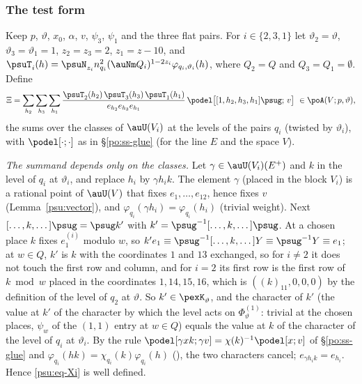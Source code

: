 \documentclass[10pt]{amsart}
\theoremstyle{definition}
\theoremstyle{remark}
\begin{document}
\subsubsection{The test form}\label{psu:ss-test}

Keep $p$, $\vartheta$, $x_0$, $\alpha$, $v$, $\psi_3$, $\psi_1$ and the three flat pairs. For
$i\in\{2,3,1\}$ let $\vartheta_2=\vartheta$, $\vartheta_3=\vartheta_1=1$, $z_2=z_3=2$, $z_1=z-10$, and
$\psuT_i(h)=\psuN_{z_i}n_{q_i}^2(\auNm Q_i)^{1-2z_i}\varphi_{q_i,\vartheta_i}(h)$, where $Q_2=Q$ and
$Q_3=Q_1=\emptyset$. Define
\begin{equation}\label{psu:eq-Xi}
\Xi=\sum_{h_2}\sum_{h_3}\sum_{h_1}\frac{\psuT_2(h_2)\,\psuT_3(h_3)\,\psuT_1(h_1)}{e_{h_2}e_{h_3}e_{h_1}}\,
\podel\bigl[[1,h_2,h_3,h_1]\psug;\,v\bigr]\ \in\poA(V;p,\vartheta),
\end{equation}
the sums over the classes of $\auU(V_i)$ at the levels of the pairs $q_i$ (twisted by $\vartheta_i$),
with $\podel[\cdot;\cdot]$ as in \S\ref{po:ss-glue} (for the line $E$ and the space $V$).

\emph{The summand depends only on the classes.} Let $\gamma\in\auU(V_i)(E^+)$ and $k$ in the level of
$q_i$ at $\vartheta_i$, and replace $h_i$ by $\gamma h_ik$. The element $\gamma$ (placed in the block
$V_i$) is a rational point of $\auU(V)$ that fixes $e_1,\dots,e_{12}$, hence fixes $v$
(Lemma~\ref{psu:vector}), and $\varphi_{q_i}(\gamma h_i)=\varphi_{q_i}(h_i)$ (trivial weight). Next
$[\dots,k,\dots]\psug=\psug k'$ with $k'=\psug^{-1}[\dots,k,\dots]\psug$. At a chosen place $k$ fixes
$e^{(i)}_1$ modulo $w$, so $k'e_1\equiv\psug^{-1}[\dots,k,\dots]Y\equiv\psug^{-1}Y\equiv e_1$; at $w\in Q$,
$k'$ is $k$ with the coordinates $1$ and $13$ exchanged, so for $i\ne2$ it does not touch the first
row and column, and for $i=2$ its first row is the first row of $k\bmod w$ placed in the coordinates
$1,14,15,16$, which is $((k)_{11},0,0,0)$ by the definition of the level of $q_2$ at $\vartheta$. So
$k'\in\pexK_\vartheta$, and the character of $k'$ (the value at $k'$ of the character by which the level
acts on $\Phi^{(1)}_\vartheta$: trivial at the chosen places, $\psi_w$ of the $(1,1)$ entry at $w\in Q$)
equals the value at $k$ of the character of the level of $q_i$ at $\vartheta_i$. By the rule
$\podel[\gamma xk;\gamma v]=\chi(k)^{-1}\podel[x;v]$ of \S\ref{po:ss-glue} and $\varphi_{q_i}(hk)=
\chi_{q_i}(k)\varphi_{q_i}(h)$ ({\cite[\S14.3]{P46}}), the two characters cancel; $e_{\gamma h_ik}=
e_{h_i}$. Hence \eqref{psu:eq-Xi} is well defined.
\end{document}
